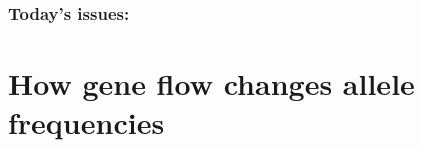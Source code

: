 
\begin{noheadline}
\begin{frame}
\frametitle{Today's issues:}
\vspace{5mm}
\tableofcontents[subsectionstyle=hide]
\end{frame}
\end{noheadline}

\section[How does gene flow cause changes in allele frequencies?]{How gene flow changes allele frequencies}

